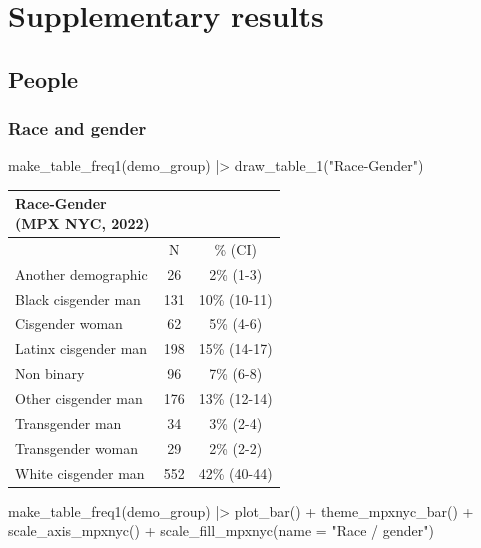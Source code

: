 \documentclass[
  letterpaper,
  DIV=11,
  numbers=noendperiod,
  oneside]{scrreprt}
\newenvironment{Shaded}{\begin{snugshade}}{\end{snugshade}}
\newcommand{\AttributeTok}[1]{\textcolor[rgb]{0.40,0.45,0.13}{#1}}
\newcommand{\FunctionTok}[1]{\textcolor[rgb]{0.28,0.35,0.67}{#1}}
\newcommand{\NormalTok}[1]{\textcolor[rgb]{0.00,0.23,0.31}{#1}}
\newcommand{\SpecialCharTok}[1]{\textcolor[rgb]{0.37,0.37,0.37}{#1}}
\newcommand{\StringTok}[1]{\textcolor[rgb]{0.13,0.47,0.30}{#1}}
\begin{document}
\hypertarget{sec-appendixresults}{%
\chapter{Supplementary results}\label{sec-appendixresults}}

\hypertarget{people}{%
\section{People}\label{people}}

\hypertarget{race-and-gender-1}{%
\subsection*{Race and gender}\label{race-and-gender-1}}

\begin{Shaded}
\begin{Highlighting}[]
\FunctionTok{make\_table\_freq1}\NormalTok{(demo\_group) }\SpecialCharTok{|\textgreater{}}
  \FunctionTok{draw\_table\_1}\NormalTok{(}\StringTok{"Race{-}Gender"}\NormalTok{)}
\end{Highlighting}
\end{Shaded}

\begin{longtable*}{lcc}
\caption*{
{\large Race-Gender} \\ 
{\small (MPX NYC, 2022)}
} \\ 
\toprule
 & N & \% (CI) \\ 
\midrule\addlinespace[2.5pt]
Another demographic & 26 & 2\% (1-3) \\ 
Black cisgender man & 131 & 10\% (10-11) \\ 
Cisgender woman & 62 & 5\% (4-6) \\ 
Latinx cisgender man & 198 & 15\% (14-17) \\ 
Non binary & 96 & 7\% (6-8) \\ 
Other cisgender man & 176 & 13\% (12-14) \\ 
Transgender man & 34 & 3\% (2-4) \\ 
Transgender woman & 29 & 2\% (2-2) \\ 
White cisgender man & 552 & 42\% (40-44) \\ 
\bottomrule
\end{longtable*}

\begin{Shaded}
\begin{Highlighting}[]
\FunctionTok{make\_table\_freq1}\NormalTok{(demo\_group) }\SpecialCharTok{|\textgreater{}}  
  \FunctionTok{plot\_bar}\NormalTok{() }\SpecialCharTok{+}
  \FunctionTok{theme\_mpxnyc\_bar}\NormalTok{() }\SpecialCharTok{+}
  \FunctionTok{scale\_axis\_mpxnyc}\NormalTok{() }\SpecialCharTok{+}
  \FunctionTok{scale\_fill\_mpxnyc}\NormalTok{(}\AttributeTok{name =} \StringTok{"Race / gender"}\NormalTok{) }
\end{Highlighting}
\end{Shaded}
\end{document}

